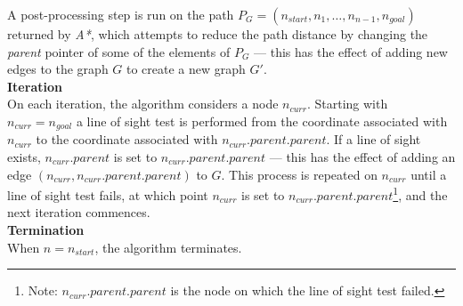 \documentclass[12pt,notitlepage]{report}
\begin{document}
A post-processing step is run on the path $P_{G} = (n_{start}, n_{1}, \ldots, n_{n-1}, n_{goal})$ returned by {\em A*}, which attempts to reduce the path distance by changing the {\em parent} pointer of some of the elements of $P_{G}$ --- this has the effect of adding new edges to the graph $G$ to create a new graph $G'$.\\

\noindent
{\bf Iteration}\\
\noindent
On each iteration, the algorithm considers a node $n_{curr}$. Starting with $n_{curr} = n_{goal}$ a line of sight test is performed from the coordinate associated with $n_{curr}$ to the coordinate associated with $n_{curr}.parent.parent$. If a line of sight exists, $n_{curr}.parent$ is set to $n_{curr}.parent.parent$ --- this has the effect of adding an edge $(n_{curr},n_{curr}.parent.parent)$ to $G$. This process is repeated on $n_{curr}$ until a line of sight test fails, at which point $n_{curr}$ is set to $n_{curr}.parent.parent$\footnote{Note: $n_{curr}.parent.parent$ is the node on which the line of sight test failed.}, and the next iteration commences. \\

\noindent
{\bf Termination}\\
\noindent
When $n = n_{start}$, the algorithm terminates.\\
\end{document}
